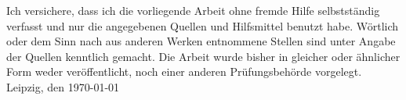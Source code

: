 \normalsize{Ich versichere, dass ich die vorliegende Arbeit ohne fremde Hilfe 
selbstständig verfasst und nur die angegebenen Quellen und Hilfsmittel benutzt habe. 
Wörtlich oder dem Sinn nach aus anderen Werken entnommene Stellen sind unter Angabe der 
Quellen kenntlich gemacht. Die Arbeit wurde bisher in gleicher oder ähnlicher Form weder 
veröffentlicht, noch einer anderen Prüfungsbehörde vorgelegt.
\newline
\newline
\newline
\newline
Leipzig, den \today}